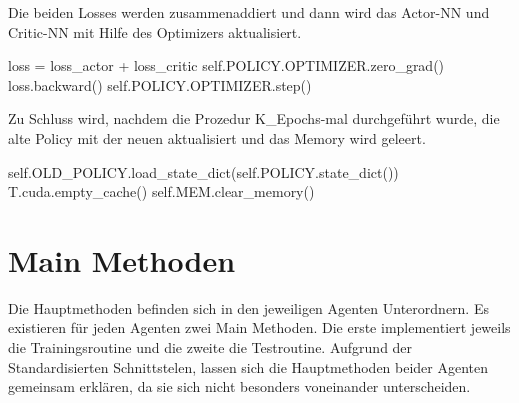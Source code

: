 Die beiden Losses werden zusammenaddiert und dann wird das Actor-NN und Critic-NN mit Hilfe des Optimizers aktualisiert.
\begin{python}
	loss = loss_actor + loss_critic
	            self.POLICY.OPTIMIZER.zero_grad()
	loss.backward()
	self.POLICY.OPTIMIZER.step()
\end{python}
Zu Schluss wird, nachdem die Prozedur K\_Epochs-mal durchgeführt wurde, die alte Policy mit der neuen aktualisiert und das Memory wird geleert.
\begin{python}
	self.OLD_POLICY.load_state_dict(self.POLICY.state_dict())
	T.cuda.empty_cache()
	self.MEM.clear_memory()
\end{python}

\section{Main Methoden}
Die Hauptmethoden befinden sich in den jeweiligen Agenten Unterordnern. Es existieren für jeden Agenten zwei Main Methoden. Die erste implementiert jeweils die Trainingsroutine und die zweite die Testroutine. Aufgrund der Standardisierten Schnittstelen, lassen sich die Hauptmethoden beider Agenten gemeinsam erklären, da sie sich nicht besonders voneinander unterscheiden.


